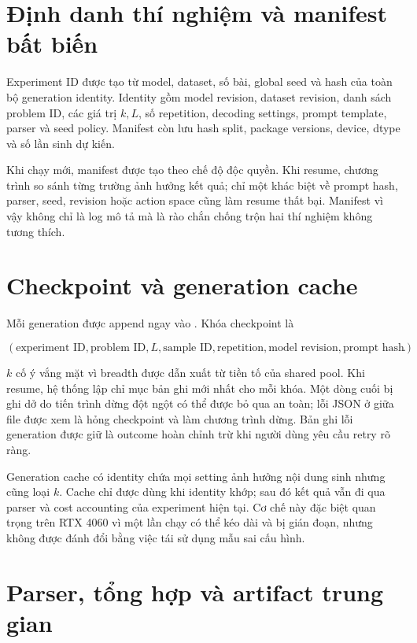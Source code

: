 \section{Định danh thí nghiệm và manifest bất biến}

Experiment ID được tạo từ model, dataset, số bài, global seed và hash của toàn bộ
generation identity. Identity gồm model revision, dataset revision, danh sách problem
ID, các giá trị $k,L$, số repetition, decoding settings, prompt template, parser và
seed policy. Manifest còn lưu hash split, package versions, device, dtype và số lần
sinh dự kiến.

Khi chạy mới, manifest được tạo theo chế độ độc quyền. Khi resume, chương trình so
sánh từng trường ảnh hưởng kết quả; chỉ một khác biệt về prompt hash, parser, seed,
revision hoặc action space cũng làm resume thất bại. Manifest vì vậy không chỉ là log
mô tả mà là rào chắn chống trộn hai thí nghiệm không tương thích.

\section{Checkpoint và generation cache}

Mỗi generation được append ngay vào . Khóa checkpoint là

\begin{equation}
  (\text{experiment ID},\text{problem ID},L,\text{sample ID},
  \text{repetition},\text{model revision},\text{prompt hash}).
\end{equation}

$k$ cố ý vắng mặt vì breadth được dẫn xuất từ tiền tố của shared pool. Khi resume,
hệ thống lập chỉ mục bản ghi mới nhất cho mỗi khóa. Một dòng cuối bị ghi dở do tiến
trình dừng đột ngột có thể được bỏ qua an toàn; lỗi JSON ở giữa file được xem là hỏng
checkpoint và làm chương trình dừng. Bản ghi lỗi generation được giữ là outcome hoàn
chỉnh trừ khi người dùng yêu cầu retry rõ ràng.

Generation cache có identity chứa mọi setting ảnh hưởng nội dung sinh nhưng cũng loại
$k$. Cache chỉ được dùng khi identity khớp; sau đó kết quả vẫn đi qua parser và cost
accounting của experiment hiện tại. Cơ chế này đặc biệt quan trọng trên RTX 4060 vì
một lần chạy có thể kéo dài và bị gián đoạn, nhưng không được đánh đổi bằng việc tái
sử dụng mẫu sai cấu hình.

\section{Parser, tổng hợp và artifact trung gian}

